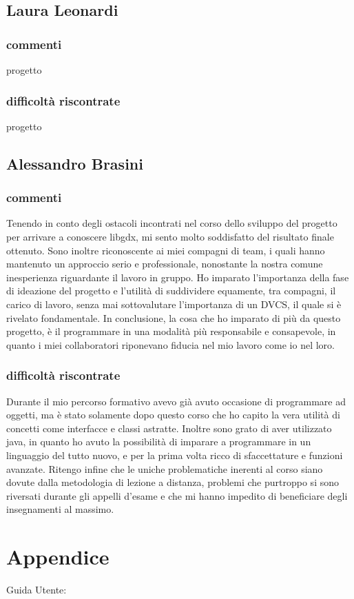\documentclass[a4paper,12pt]{report}
\begin{document}
\section{Laura Leonardi}
\subsection{commenti}
progetto 
\subsection{difficoltà riscontrate}
progetto 
\newpage

\section{Alessandro Brasini}
\subsection{commenti}
Tenendo in conto degli ostacoli incontrati nel corso dello sviluppo del progetto per arrivare a conoscere libgdx, mi sento molto soddisfatto del risultato finale ottenuto.
Sono inoltre riconoscente ai miei compagni di team, i quali hanno mantenuto un approccio serio e professionale, nonostante la nostra comune inesperienza riguardante il lavoro in gruppo.
Ho imparato l'importanza della fase di ideazione del progetto e l'utilità di suddividere equamente, tra compagni, il carico di lavoro, senza mai sottovalutare l'importanza di un DVCS, il quale si è rivelato fondamentale.
In conclusione, la cosa che ho imparato di più da questo progetto, è il programmare in una modalità più responsabile e consapevole, in quanto i miei collaboratori riponevano fiducia nel mio lavoro come io nel loro.
\subsection{difficoltà riscontrate}
Durante il mio percorso formativo avevo già avuto occasione di programmare ad oggetti, ma è stato solamente dopo questo corso che ho capito la vera utilità di concetti come interfacce e classi astratte. Inoltre sono grato di aver utilizzato java, in quanto ho avuto la possibilità di imparare a programmare in un linguaggio del tutto nuovo, e per la prima volta ricco di sfaccettature e funzioni avanzate.
Ritengo infine che le uniche problematiche inerenti al corso siano dovute dalla metodologia di lezione a distanza, problemi che purtroppo si sono riversati durante gli appelli d'esame e che mi hanno impedito di beneficiare degli insegnamenti al massimo.
\newpage

\chapter{Appendice}
Guida Utente: \\
\end{document}
